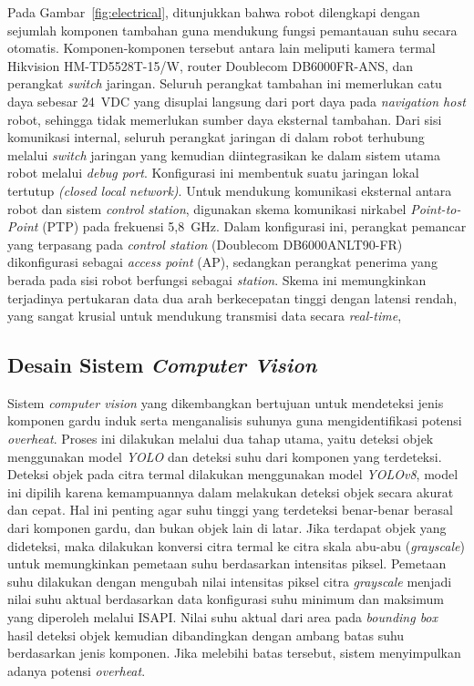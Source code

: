 Pada Gambar~\ref{fig:electrical}, ditunjukkan bahwa robot dilengkapi dengan sejumlah komponen tambahan guna mendukung fungsi pemantauan suhu secara otomatis. Komponen-komponen tersebut antara lain meliputi kamera termal Hikvision HM-TD5528T-15/W, router Doublecom DB6000FR-ANS, dan perangkat \emph{switch} jaringan. Seluruh perangkat tambahan ini memerlukan catu daya sebesar 24~VDC yang disuplai langsung dari port daya pada \emph{navigation host} robot, sehingga tidak memerlukan sumber daya eksternal tambahan. Dari sisi komunikasi internal, seluruh perangkat jaringan di dalam robot terhubung melalui \emph{switch} jaringan yang kemudian diintegrasikan ke dalam sistem utama robot melalui \emph{debug port}. Konfigurasi ini membentuk suatu jaringan lokal tertutup \emph{(closed local network)}. Untuk mendukung komunikasi eksternal antara robot dan sistem \emph{control station}, digunakan skema komunikasi nirkabel \emph{Point-to-Point} (PTP) pada frekuensi 5{,}8~GHz. Dalam konfigurasi ini, perangkat pemancar yang terpasang pada \emph{control station} (Doublecom DB6000ANLT90-FR) dikonfigurasi sebagai \emph{access point} (AP), sedangkan perangkat penerima yang berada pada sisi robot berfungsi sebagai \emph{station}. Skema ini memungkinkan terjadinya pertukaran data dua arah berkecepatan tinggi dengan latensi rendah, yang sangat krusial untuk mendukung transmisi data secara \emph{real-time}, 


\subsection{Desain Sistem \emph{Computer Vision}}

Sistem \emph{computer vision} yang dikembangkan bertujuan untuk mendeteksi jenis komponen gardu induk serta menganalisis suhunya guna mengidentifikasi potensi \emph{overheat}. Proses ini dilakukan melalui dua tahap utama, yaitu deteksi objek menggunakan model \emph{YOLO} dan deteksi suhu dari komponen yang terdeteksi. Deteksi objek pada citra termal dilakukan menggunakan model \emph{YOLOv8}, model ini dipilih karena kemampuannya dalam melakukan deteksi objek secara akurat dan cepat. Hal ini penting agar suhu tinggi yang terdeteksi benar-benar berasal dari komponen gardu, dan bukan objek lain di latar. Jika terdapat objek yang dideteksi, maka dilakukan konversi citra termal ke citra skala abu-abu (\emph{grayscale}) untuk memungkinkan pemetaan suhu berdasarkan intensitas piksel. Pemetaan suhu dilakukan dengan mengubah nilai intensitas piksel citra \emph{grayscale} menjadi nilai suhu aktual berdasarkan data konfigurasi suhu minimum dan maksimum yang diperoleh melalui ISAPI. Nilai suhu aktual dari area pada \emph{bounding box} hasil deteksi objek kemudian dibandingkan dengan ambang batas suhu berdasarkan jenis komponen. Jika melebihi batas tersebut, sistem menyimpulkan adanya potensi \emph{overheat}.

